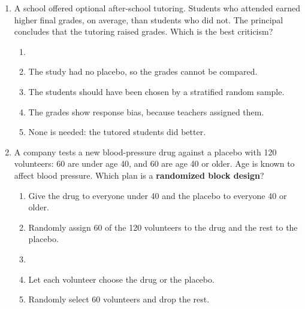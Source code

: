 \documentclass[12pt]{article}
\begin{document}
\begin{enumerate}[leftmargin=1.9em, itemsep=0.13in]
  \boxguard[13]
  \item A school offered optional after-school tutoring. Students who attended earned higher
        final grades, on average, than students who did not. The principal concludes that the
        tutoring raised grades. Which is the best criticism?
        \begin{enumerate}[label=\textbf{(\Alph*)}, leftmargin=2.2em, itemsep=2pt]
          \item {}
          \item The study had no placebo, so the grades cannot be compared.
          \item The students should have been chosen by a stratified random sample.
          \item The grades show response bias, because teachers assigned them.
          \item None is needed: the tutored students did better.\hfill{}\rule[-0.2in]{0pt}{0.48in}
        \end{enumerate}

  \boxguard[13]
  \item A company tests a new blood-pressure drug against a placebo with 120 volunteers: 60 are
        under age 40, and 60 are age 40 or older. Age is known to affect blood pressure. Which
        plan is a \textbf{randomized block design}?
        \begin{enumerate}[label=\textbf{(\Alph*)}, leftmargin=2.2em, itemsep=2pt]
          \item Give the drug to everyone under 40 and the placebo to everyone 40 or older.
          \item Randomly assign 60 of the 120 volunteers to the drug and the rest to the placebo.
          \item {}
          \item Let each volunteer choose the drug or the placebo.
          \item Randomly select 60 volunteers and drop the rest.\hfill{}\rule[-0.2in]{0pt}{0.48in}
        \end{enumerate}


\end{enumerate}
\end{document}
